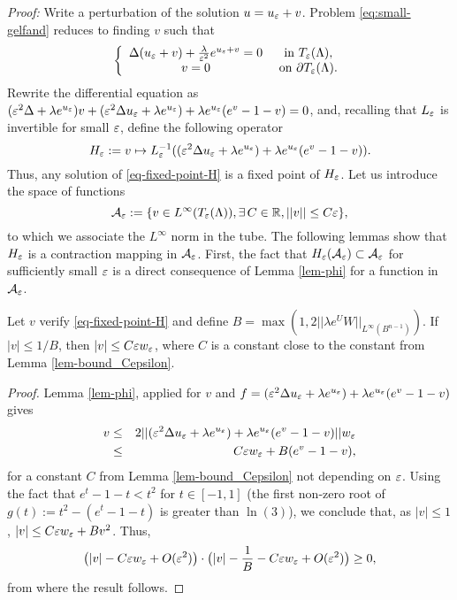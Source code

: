 \textit{Proof:} Write a perturbation of the solution $u=u_\varepsilon+v$. Problem
    \ref{eq:small-gelfand} reduces to finding $v$ such that
    \begin{equation}
        \label{eq-fixed-point-H}
        \left\{
            \begin{array}{cc}
                \Delta (u_\varepsilon+v)+\frac{\lambda}{\varepsilon^2}e^{u_\varepsilon+v}=0& \mbox{ in }T_\varepsilon(\Lambda),\\
                v=0 & \mbox{ on }\partial T_\varepsilon(\Lambda).
            \end{array}
            \right.
    \end{equation}
    Rewrite the differential equation as $(\varepsilon^2\Delta + \lambda
    e^{u_\varepsilon})v+(\varepsilon^2\Delta u_\varepsilon + \lambda e^{u_\varepsilon})+\lambda
    e^{u_\varepsilon}(e^v-1-v)=0$, and, recalling that $L_\varepsilon$ is invertible for
    small $\varepsilon$, define the following operator
    \begin{equation}
        H_\varepsilon:= v\mapsto L_\varepsilon^{-1}((\varepsilon^2\Delta u_\varepsilon + \lambda
        e^{u_\varepsilon})+\lambda e^{u_\varepsilon}(e^v-1-v)).
    \end{equation}
    Thus, any solution of \ref{eq-fixed-point-H}  is a fixed point of $H_\varepsilon$. Let us introduce the space of functions
    $$\mathcal{A}_\varepsilon :=\{v\in L^\infty(T_\varepsilon(\Lambda)),\exists\, C \in \mathbb{R}, ||v||\leq
    C\varepsilon\},$$
    to which we associate the $L^\infty$ norm in the tube.
    The following lemmas show that $H_\varepsilon$ is a contraction mapping in
    $\mathcal{A}_\varepsilon$. First, the fact that $H_\varepsilon(\mathcal{A}_\varepsilon)\subset \mathcal{A}_\varepsilon$ for
    sufficiently small $\varepsilon$ is a direct consequence of Lemma \ref{lem-phi} for
    a function in $\mathcal{A}_\varepsilon$. 
    \begin{lemma}
        Let $v$ verify \ref{eq-fixed-point-H} and define $B=\max(1,2||\lambda
        e^U W||_{L^\infty(B^{n-1})})$. If $|v|\leq 1/B$, then $|v|\leq C\varepsilon
        w_\varepsilon$, where $C$ is a constant close to the constant from Lemma
        \ref{lem-bound_Cepsilon}.
    \end{lemma}
    \begin{proof} Lemma \ref{lem-phi}, applied for $v$ and $f=(\varepsilon^2\Delta
        u_\varepsilon+\lambda e^{u_\varepsilon})+ \lambda e^{u_\varepsilon}(e^v-1-v)$ gives
    \begin{eqnarray}
        v &\leq & 2 ||(\varepsilon^2\Delta u_\varepsilon + \lambda e^{u_\varepsilon})+\lambda
        e^{u_\varepsilon}(e^v-1-v)||w_\varepsilon\\
          &\leq & C\varepsilon w_\varepsilon + B(e^v-1-v),
    \end{eqnarray}
    for a constant $C$ from Lemma \ref{lem-bound_Cepsilon} not depending on
    $\varepsilon$. Using the fact that $e^t-1-t<t^2$ for $t\in[-1,1]$ (the first
    non-zero root of $g(t):=t^2-(e^t-1-t)$ is greater than $\ln(3)$), we
    conclude that, as $|v|\leq 1$, $|v|\leq C\varepsilon w_\varepsilon+Bv^2$. Thus,
    \begin{equation}
        \big(|v|-C\varepsilon w_\varepsilon+O(\varepsilon^2)\big)\cdot\big( |v| -\frac{1}{B}-C\varepsilon
        w_\varepsilon+O(\varepsilon^2)\big)\geq 0,
    \end{equation}
    from where the result follows. 
\end{proof}

